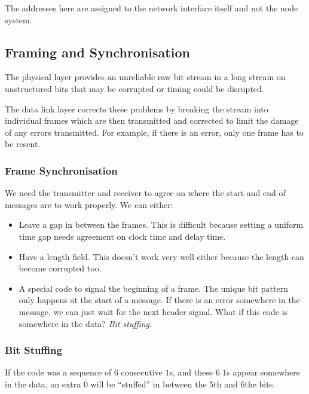 \begin{note}
	The addresses here are assigned to the network interface itself and not the node system.
\end{note}

\subsection{Framing and Synchronisation}\label{sub:framing_and_synchronisation}

The physical layer provides an unreliable raw bit stream in a long stream on unstructured bits that may be corrupted or timing could be disrupted.

The data link layer corrects these problems by breaking the stream into individual frames which are then transmitted and corrected to limit the damage of any errors transmitted.
For example, if there is an error, only one frame has to be resent.

\subsubsection{Frame Synchronisation}\label{ssub:frame_synchronisation}

We need the transmitter and receiver to agree on where the start and end of messages are to work properly.
We can either:
\begin{itemize}
	\item Leave a gap in between the frames.
	      This is difficult because setting a uniform time gap needs agreement on clock time and delay time.
	\item Have a length field.
	      This doesn't work very well either because the length can become corrupted too.
	\item A special code to signal the beginning of a frame.
	      The unique bit pattern only happens at the start of a message.
	      If there is an error somewhere in the message, we can just wait for the next header signal.
	      What if this code is somewhere in the data? \emph{Bit stuffing.}
\end{itemize}

\subsubsection{Bit Stuffing}\label{ssub:bit_stuffing}

If the code was a sequence of \(6\) consecutive \(1\)s, and these \(6\) \(1\)s appear somewhere in the data, an extra \(0\) will be ``stuffed'' in between the \(5\)th and \(6\)the bits.

